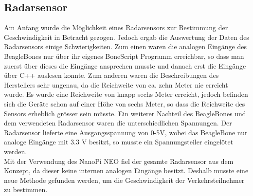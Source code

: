 \subsection{Radarsensor}
Am Anfang wurde die Möglichkeit eines Radarsensors zur Bestimmung der Geschwindigkeit in Betracht gezogen. Jedoch ergab die Auswertung der Daten des Radarsensors einige Schwierigkeiten. Zum einen waren die analogen Eingänge des BeagleBones nur über ihr eigenes BoneScript Programm erreichbar, so dass man zuerst über dieses die Eingänge ansprechen musste und danach erst die Eingänge über C++ auslesen konnte. Zum anderen waren die Beschreibungen des Herstellers sehr ungenau, da die Reichweite von ca. zehn Meter nie erreicht wurde. Es wurde eine Reichweite von knapp sechs Meter erreicht, jedoch befinden sich die Geräte schon auf einer Höhe von sechs Meter, so dass die Reichweite des Sensors erheblich grösser sein müsste. Ein weiterer Nachteil des BeagleBones und dem verwendeten Radarsensor waren die unterschiedlichen Spannungen. Der Radarsensor lieferte eine Ausgangsspannung von 0-5V, wobei das BeagleBone nur analoge Eingänge mit 3.3 V besitzt, so musste ein Spannungsteiler eingelötet werden. \\
Mit der Verwendung des NanoPi NEO fiel der gesamte Radarsensor aus dem Konzept, da dieser keine internen analogen Eingänge besitzt. Deshalb musste eine neue Methode gefunden werden, um die Geschwindigkeit der Verkehrsteilnehmer zu bestimmen.
